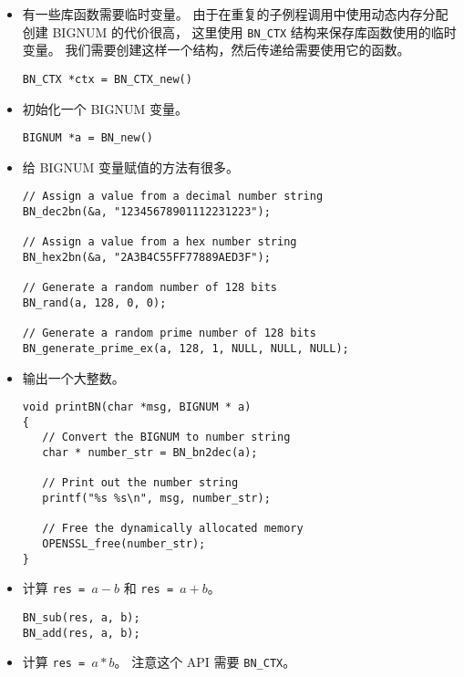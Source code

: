 \begin{itemize}

\item 有一些库函数需要临时变量。
由于在重复的子例程调用中使用动态内存分配创建 BIGNUM 的代价很高，
这里使用 \texttt{BN\_CTX} 结构来保存库函数使用的临时变量。
我们需要创建这样一个结构，然后传递给需要使用它的函数。

\begin{lstlisting}
BN_CTX *ctx = BN_CTX_new()
\end{lstlisting}


\item 初始化一个 BIGNUM 变量。

\begin{lstlisting}
BIGNUM *a = BN_new()
\end{lstlisting}


\item 给 BIGNUM 变量赋值的方法有很多。


\begin{lstlisting}
// Assign a value from a decimal number string
BN_dec2bn(&a, "12345678901112231223");

// Assign a value from a hex number string
BN_hex2bn(&a, "2A3B4C55FF77889AED3F");

// Generate a random number of 128 bits
BN_rand(a, 128, 0, 0);

// Generate a random prime number of 128 bits
BN_generate_prime_ex(a, 128, 1, NULL, NULL, NULL);
\end{lstlisting}


\item 输出一个大整数。

\begin{lstlisting}
void printBN(char *msg, BIGNUM * a)
{
   // Convert the BIGNUM to number string
   char * number_str = BN_bn2dec(a);

   // Print out the number string
   printf("%s %s\n", msg, number_str);

   // Free the dynamically allocated memory
   OPENSSL_free(number_str);
}
\end{lstlisting}


\item 计算 \texttt{res = $a - b$} 和 \texttt{res = $a + b$}。

\begin{lstlisting}
BN_sub(res, a, b);
BN_add(res, a, b);
\end{lstlisting}



\item 计算 \texttt{res = $a * b$}。
注意这个 API 需要 \texttt{BN\_CTX}。


\end{itemize}
